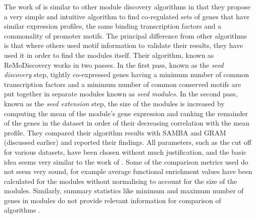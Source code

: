 The work of \citet{lemmens06Inferring} is similar to other module discovery algorithms in that they propose a very simple and intuitive algorithm to find co-regulated sets of genes that have similar expression profiles, the same binding transcription factors and a commonality of promoter motifs. The principal difference from other algorithms is that where others used motif information to validate their results, they have used it in order to find the modules itself. Their algorithm, known as ReMoDiscovery works in two passes. In the first pass, known as the \textit{seed discovery} step, tightly co-expressed genes having a minimum number of common transcription factors and a minimum number of common conserved motifs are put together in separate modules known as \textit{seed modules}. In the second pass, known as the \textit{seed extension} step, the size of the modules is increased by computing the mean of the module's gene expression and ranking the remainder of the genes in the dataset in order of their decreasing correlation with the mean profile. They compared their algorithm results with \ac{SAMBA} and \ac{GRAM} (discussed earlier) and reported their findings. All parameters, such as the cut off for various datasets, have been chosen without much justification, and the basic idea seems very similar to the work of \citet{barjoseph03computational}. Some of the comparison metrics used do not seem very sound, for example average functional enrichment values have been calculated for the modules without normalising to account for the size of the modules. Similarly, summary statistics like minimum and maximum number of genes in modules do not provide relevant information for comparison of algorithms . 

